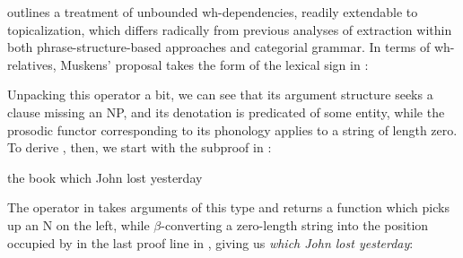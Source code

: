 \documentclass[output=paper,colorlinks,citecolor=brown]{langscibook}
\begin{document}
\citet{muskens03} outlines a treatment of unbounded wh-dependencies,
readily extendable to topicalization, which differs radically from
previous analyses of extraction within both phrase-structure-based
approaches and categorial grammar. In terms of wh-relatives,
Muskens' proposal takes the form of the lexical sign in :

\begin{exe}
 \ex\label{whrel}
  \LexEnt{\pt{λ \ensuremath{\greeks}. which \BobsO \ensuremath{\greeks}(\E)}}{\sem{ λP λQ λw. P(w) \ensuremath{ \wedge\xspace } Q(w)}}{\syncat{(N\bsl{}N)\vs (S\vs NP)}}
\end{exe}
Unpacking this operator a bit, we can see that its argument structure
seeks a clause missing an NP, and its denotation is predicated of
some entity, while the prosodic functor corresponding to its phonology
applies to a string of length zero. To derive , then, we start
with the subproof in :

\begin{exe}
 \ex\label{book}
  the book which John lost yesterday
\end{exe}
\begin{exe}
 \ex\label{bookProof1}
\end{exe}
The operator in  takes arguments of this type and returns a
function which picks up an N on the left, while $\beta$-converting a
zero-length string into the position occupied by  in the last
proof line in , giving us \textit{which John lost yesterday}:
\end{document}
